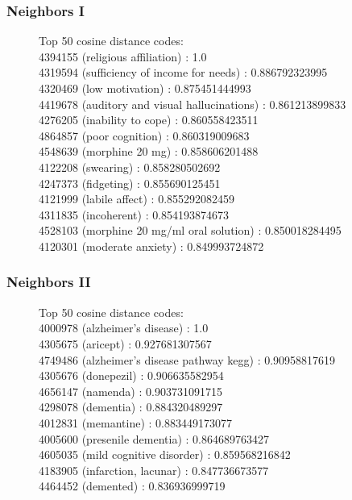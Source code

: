 \documentclass{beamer}
\begin{document}
\begin{frame}
\frametitle{Neighbors I}
\begin{figure}[htb]
Top 50 cosine distance codes: \\
4394155 (religious affiliation) : 1.0 \\
4319594 (sufficiency of income for needs) : 0.886792323995 \\
4320469 (low motivation) : 0.875451444993 \\
4419678 (auditory and visual hallucinations) : 0.861213899833 \\
4276205 (inability to cope) : 0.860558423511 \\
4864857 (poor cognition) : 0.860319009683 \\
4548639 (morphine 20 mg) : 0.858606201488 \\
4122208 (swearing) : 0.858280502692 \\
4247373 (fidgeting) : 0.855690125451 \\
4121999 (labile affect) : 0.855292082459 \\
4311835 (incoherent) : 0.854193874673 \\
4528103 (morphine 20 mg/ml oral solution) : 0.850018284495 \\
4120301 (moderate anxiety) : 0.849993724872 \\
\end{figure}
\end{frame}

\begin{frame}
\frametitle{Neighbors II}
\begin{figure}[htb]
Top 50 cosine distance codes: \\
4000978 (alzheimer's disease) : 1.0 \\
4305675 (aricept) : 0.927681307567 \\
4749486 (alzheimer's disease pathway kegg) : 0.90958817619 \\
4305676 (donepezil) : 0.906635582954 \\
4656147 (namenda) : 0.903731091715 \\
4298078 (dementia) : 0.884320489297 \\
4012831 (memantine) : 0.883449173077 \\
4005600 (presenile dementia) : 0.864689763427 \\
4605035 (mild cognitive disorder) : 0.859568216842 \\
4183905 (infarction, lacunar) : 0.847736673577 \\
4464452 (demented) : 0.836936999719 \\
\end{figure}
\end{frame}
\end{document}
